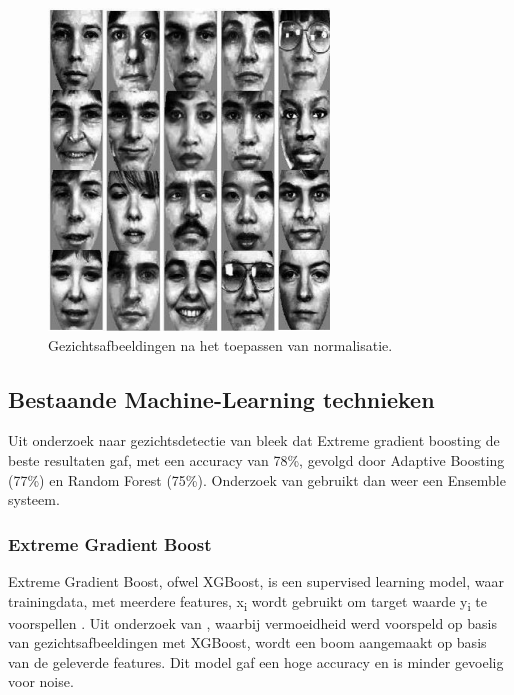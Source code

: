 \begin{figure}
    \centering
    \includegraphics[width=\columnwidth]{graphics/afternorm.PNG}
    \caption{\label{fig:afternormalisation}Gezichtsafbeeldingen na het toepassen van normalisatie\autocite{Chen2011}.}
\end{figure}  

\subsection{Bestaande Machine-Learning technieken}
Uit onderzoek naar gezichtsdetectie van \textcite{Sanil2023} bleek dat Extreme gradient boosting de beste resultaten gaf, met een accuracy van 78\%, gevolgd door Adaptive Boosting (77\%) en Random Forest (75\%). Onderzoek van \autocite{Khan2017} gebruikt dan weer een Ensemble systeem. 

\subsubsection{Extreme Gradient Boost}
\label{subsub:xgboost}
Extreme Gradient Boost, ofwel XGBoost, is een supervised learning model, waar trainingdata, met meerdere features, x\textsubscript{i} wordt gebruikt om target waarde y\textsubscript{i} te voorspellen \autocite{XGBoost2023}. Uit onderzoek van \autocite{Chen2023}, waarbij vermoeidheid werd voorspeld op basis van gezichtsafbeeldingen met XGBoost, wordt een boom aangemaakt op basis van de geleverde features. Dit model gaf een hoge accuracy en is minder gevoelig voor noise. 

